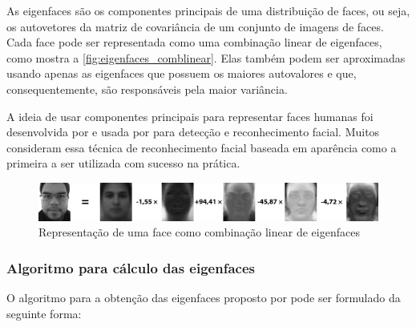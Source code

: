 As eigenfaces são os componentes principais de uma distribuição de faces, ou seja, os autovetores da matriz de covariância de um conjunto de imagens de faces.
Cada face pode ser representada como uma combinação linear de eigenfaces, como mostra a \autoref{fig:eigenfaces_comblinear}. Elas também podem ser aproximadas usando apenas as eigenfaces que possuem os maiores autovalores e que, consequentemente, são responsáveis pela maior variância.

A ideia de usar componentes principais para representar faces humanas foi desenvolvida por  e usada por \cite{turk1991eigenfaces} para detecção e reconhecimento facial.
Muitos consideram essa técnica de reconhecimento facial baseada em aparência como a primeira a ser utilizada com sucesso na prática.

\begin{figure}[htbp]
    \centering
    \caption{Representação de uma face como combinação linear de eigenfaces}
    \label{fig:eigenfaces_comblinear}
    \includegraphics[width=0.95\linewidth]{imagens/eign_lincomb.png}
\end{figure}


\subsubsection{Algoritmo para cálculo das eigenfaces}\label{sec:eigenfaces_algoritmo}

O algoritmo para a obtenção das eigenfaces proposto por  pode ser formulado da seguinte forma:

